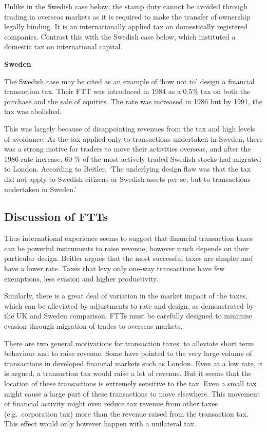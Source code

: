\documentclass[]{tufte-handout}
\begin{document}
Unlike in the Swedish case below, the stamp duty cannot be avoided
through trading in overseas markets as it is required to make the
transfer of ownership legally binding. It is an internationally applied
tax on domestically registered companies. Contrast this with the Swedish
case below, which instituted a domestic tax on international capital.

\textbf{Sweden}

The Swedish case may be cited as an example of `how not to' design a
financial transaction tax. Their FTT was introduced in 1984 as a 0.5\%
tax on both the purchase and the sale of equities. The rate was
increased in 1986 but by 1991, the tax was abolished.

This was largely because of disappointing revenues from the tax and high
levels of avoidance. As the tax applied only to transactions undertaken
in Sweden, there was a strong motive for traders to move their
activities overseas, and after the 1986 rate increase, 60 \% of the most
actively traded Swedish stocks had migrated to London. According to
Beitler, `The underlying design flaw was that the tax did not apply to
Swedish citizens or Swedish assets per se, but to transactions
undertaken in Sweden.'

\hypertarget{discussion-of-ftts}{%
\subsection{Discussion of FTTs}\label{discussion-of-ftts}}

Thus international experience seems to suggest that financial
transaction taxes can be powerful instruments to raise revenue, however
much depends on their particular design. Beitler argues that the most
successful taxes are simpler and have a lower rate. Taxes that levy only
one-way transactions have few exemptions, less evasion and higher
productivity.

Similarly, there is a great deal of variation in the market impact of
the taxes, which can be alleviated by adjustments to rate and design, as
demonstrated by the UK and Sweden comparison. FTTs must be carefully
designed to minimise evasion through migration of trades to overseas
markets.

There are two general motivations for transaction taxes: to alleviate
short term behaviour and to raise revenue. Some have pointed to the very
large volume of transactions in developed financial markets such as
London. Even at a low rate, it is argued, a transaction tax would raise
a lot of revenue. But it seems that the location of these transactions
is extremely sensitive to the tax. Even a small tax might cause a large
part of these transactions to move elsewhere. This movement of financial
activity might even reduce tax revenue from other taxes
(e.g.~corporation tax) more than the revenue raised from the transaction
tax. This effect would only however happen with a unilateral tax.
\end{document}
